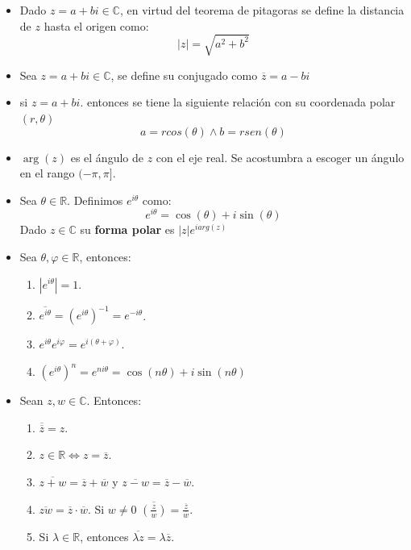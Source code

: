\documentclass[letterpaper,10pt]{article}
\newcommand{\R}{\mathbb R}
\newcommand{\C}{\mathbb C}
\newcommand{\ssi}{\Longleftrightarrow} %
\theoremstyle{plain}
\begin{document}
\begin{framed}
\begin{multicols}{2}
\begin{itemize}
            \item Dado $z=a+bi \in \C$, en virtud del teorema de pitagoras se define la distancia de $z$ hasta el origen como: $$|z|=\sqrt{a^2+b^2}$$ 
            \item Sea $z=a+bi\in \C$, se define su conjugado como $\overline{z}=a-bi$
            \item si $z=a+bi$. entonces se tiene la siguiente relación con su coordenada polar $(r,\theta)$
                $$ a=rcos(\theta) \land b=rsen(\theta) $$
            \item $\arg(z)$ es el ángulo de $z$ con el eje real. Se acostumbra a escoger un ángulo en el rango $(-\pi,\pi ]$.
            \item Sea $\theta \in \R$. Definimos $e^{i\theta}$ como:
            $$
            e^{i\theta}= \cos(\theta) + i \sin (\theta)
            $$
            Dado $z\in \C$ su \textbf{forma polar} es $|z|e^{iarg(z)}$
            \item Sea $\theta, \varphi \in \R$, entonces:
            	\begin{enumerate}
            		\item $|e^{i\theta}|=1$.
            		\item $\overline{e^{i\theta}}=(e^{i\theta})^{-1}=e^{-i\theta}$.
            		\item $e^{i\theta}e^{i\varphi}=e^{i(\theta + \varphi)}$.
            		\item $(e^{i\theta})^n=e^{ni\theta}=\cos(n\theta)+i \sin(n \theta) $
            	\end{enumerate}
            \item Sean $z,w \in \C$. Entonces:
                \begin{enumerate}
                    \item $\overline{\overline{z}}=z$.
                    \item $z \in \R \ssi z=\overline{z}.$
                    \item $\overline{z+w}=\overline{z}+\overline{w}$ y $\overline{z-w}=\overline{z}-\overline{w}$.
                    \item $\overline {zw} = \overline{z} \cdot \overline{w}$. Si $w\neq 0$ $\overline{\left(\frac{z}{w}\right)}=\frac{\overline{z}}{\overline{w}}$.
                    \item Si $\lambda \in \R$, entonces $\overline{\lambda z }= \lambda \overline z$.
                    

\end{enumerate}
\end{itemize}
\end{multicols}
\end{framed}
\end{document}
